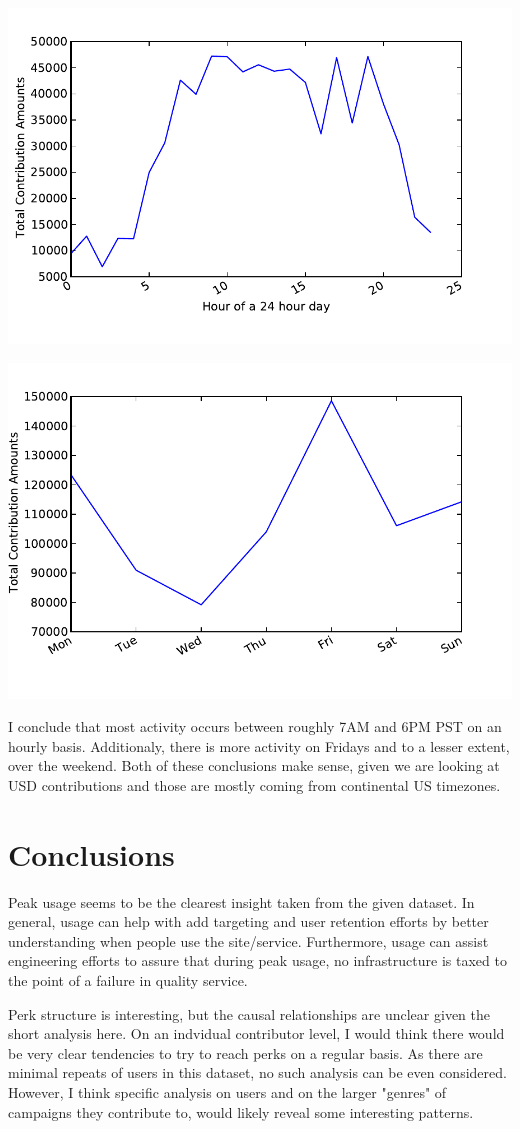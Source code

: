 \documentclass{article}[12pt]
\begin{document}
\includegraphics[scale=0.7]{Hours.pdf}

\includegraphics[scale=0.7]{DayOfWeek.pdf}

I conclude that most activity occurs between roughly 7AM and 6PM PST on an hourly basis.
 Additionaly, there is more activity on Fridays and to a lesser extent, over the weekend.
Both of these conclusions make sense, given we are looking at USD contributions and those are
mostly coming from continental US timezones.


\section{Conclusions}
Peak usage seems to be the clearest insight taken from the given dataset. In general, usage
can help with add targeting and user retention efforts by better understanding when people use
the site/service. Furthermore, usage can assist engineering efforts to assure that during peak
usage, no infrastructure is taxed to the point of a failure in quality service.

Perk structure is interesting, but the causal relationships are unclear given the short analysis here. On an indvidual contributor level, I would think there would be very clear
tendencies to try to reach perks on a regular basis. As there are minimal repeats of users
in this dataset, no such analysis can be even considered. However, I think specific analysis
on users and on the larger "genres" of campaigns they contribute to, would likely reveal some interesting patterns.
\end{document}
